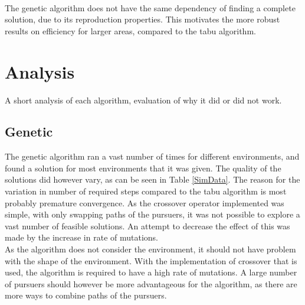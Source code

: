 \\The genetic algorithm does not have the same dependency of finding a complete solution, due to its reproduction properties. This motivates the more robust results on efficiency for larger areas, compared to the tabu algorithm. 
	
\section{Analysis}
A short analysis of each algorithm,  evaluation of why it did or did not work.

\subsection{Genetic}
The genetic algorithm ran a vast number of times for different environments, and found a solution for most environments that it was given. The quality of the solutions did however vary, as can be seen in Table \ref{SimData}. The reason for the variation in number of required steps compared to the tabu algorithm is most probably premature convergence. As the crossover operator implemented was simple, with only swapping paths of the pursuers, it was not possible to explore a vast number of feasible solutions. An attempt to decrease the effect of this was made by the increase in rate of mutations.\\
As the algorithm does not consider the environment, it should not have problem with the shape of the environment. With the implementation of crossover that is used, the algorithm is required to have a high rate of mutations. A large number of pursuers should however be more advantageous for the algorithm, as there are more ways to combine paths of the pursuers.
